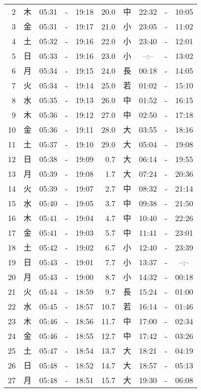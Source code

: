 \documentclass[a4j,10pt]{jsarticle}
\begin{document}
\begin{center}
\begin{table}[ht]
\begin{center}
\begin{tabular}{|rc|ccc|rc|ccc|}
  2 & 木 & 05:31 &-& 19:18 & 20.0 & 中 & 22:32 &-& 10:05 \\
  3 & 金 & 05:31 &-& 19:17 & 21.0 & 小 & 23:05 &-& 11:02 \\
  4 & 土 & 05:32 &-& 19:16 & 22.0 & 小 & 23:40 &-& 12:01 \\
  5 & 日 & 05:33 &-& 19:16 & 23.0 & 小 &  --:--  &-& 13:02 \\
  6 & 月 & 05:34 &-& 19:15 & 24.0 & 長 & 00:18 &-& 14:05 \\
  7 & 火 & 05:34 &-& 19:14 & 25.0 & 若 & 01:02 &-& 15:10 \\
  8 & 水 & 05:35 &-& 19:13 & 26.0 & 中 & 01:52 &-& 16:15 \\
  9 & 木 & 05:36 &-& 19:12 & 27.0 & 中 & 02:50 &-& 17:18 \\
 10 & 金 & 05:36 &-& 19:11 & 28.0 & 大 & 03:55 &-& 18:16 \\
 11 & 土 & 05:37 &-& 19:10 & 29.0 & 大 & 05:04 &-& 19:08 \\
 12 & 日 & 05:38 &-& 19:09 &  0.7 & 大 & 06:14 &-& 19:55 \\
 13 & 月 & 05:39 &-& 19:08 &  1.7 & 大 & 07:24 &-& 20:36 \\
 14 & 火 & 05:39 &-& 19:07 &  2.7 & 中 & 08:32 &-& 21:14 \\
 15 & 水 & 05:40 &-& 19:05 &  3.7 & 中 & 09:38 &-& 21:50 \\
 16 & 木 & 05:41 &-& 19:04 &  4.7 & 中 & 10:40 &-& 22:26 \\
 17 & 金 & 05:41 &-& 19:03 &  5.7 & 中 & 11:41 &-& 23:01 \\
 18 & 土 & 05:42 &-& 19:02 &  6.7 & 小 & 12:40 &-& 23:39 \\
 19 & 日 & 05:43 &-& 19:01 &  7.7 & 小 & 13:37 &-&  --:--  \\
 20 & 月 & 05:43 &-& 19:00 &  8.7 & 小 & 14:32 &-& 00:18 \\
 21 & 火 & 05:44 &-& 18:59 &  9.7 & 長 & 15:24 &-& 01:00 \\
 22 & 水 & 05:45 &-& 18:57 & 10.7 & 若 & 16:14 &-& 01:46 \\
 23 & 木 & 05:46 &-& 18:56 & 11.7 & 中 & 17:00 &-& 02:34 \\
 24 & 金 & 05:46 &-& 18:55 & 12.7 & 中 & 17:42 &-& 03:26 \\
 25 & 土 & 05:47 &-& 18:54 & 13.7 & 大 & 18:21 &-& 04:19 \\
 26 & 日 & 05:48 &-& 18:52 & 14.7 & 大 & 18:57 &-& 05:13 \\
 27 & 月 & 05:48 &-& 18:51 & 15.7 & 大 & 19:30 &-& 06:08 \\

\end{tabular}
\end{center}
\end{table}
\end{center}
\end{document}
